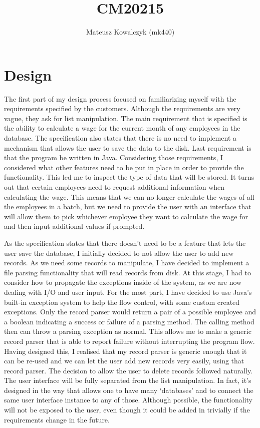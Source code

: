 \documentclass{report}
\begin{document}
\title{CM20215} \author{Mateusz Kowalczyk (mk440)} \maketitle
\section*{Design}

The first part of my design process focused on familiarizing myself
with the requirements specified by the customers. Although the
requirements are very vague, they ask for list manipulation. The main
requirement that is specified is the ability to calculate a wage for
the current month of any employees in the database. The specification
also states that there is no need to implement a mechanism that allows
the user to save the data to the disk. Last requirement is that the
program be written in Java. Considering those requirements, I
considered what other features need to be put in place in order to
provide the functionality. This led me to inspect the type of data
that will be stored. It turns out that certain employees need to
request additional information when calculating the wage. This means
that we can no longer calculate the wages of all the employees in a
batch, but we need to provide the user with an interface that will
allow them to pick whichever employee they want to calculate the wage
for and then input additional values if prompted.

As the specification states that there doesn't need to be a feature
that lets the user save the database, I initially decided to not allow
the user to add new records. As we need some records to manipulate, I
have decided to implement a file parsing functionality that will read
records from disk. At this stage, I had to consider how to propagate
the exceptions inside of the system, as we are now dealing with I/O
and user input. For the most part, I have decided to use Java's
built-in exception system to help the flow control, with some custom
created exceptions. Only the record parser would return a pair of a
possible employee and a boolean indicating a success or failure of a
parsing method. The calling method then can throw a parsing exception
as normal. This allows me to make a generic record parser that is able
to report failure without interrupting the program flow. Having
designed this, I realised that my record parser is generic enough that
it can be re-used and we can let the user add new records very easily,
using that record parser. The decision to allow the user to delete
records followed naturally. The user interface will be fully separated
from the list manipulation. In fact, it's designed in the way that
allows one to have many `databases' and to connect the same user
interface instance to any of those. Although possible, the
functionality will not be exposed to the user, even though it could be
added in trivially if the requirements change in the future.
\end{document}
